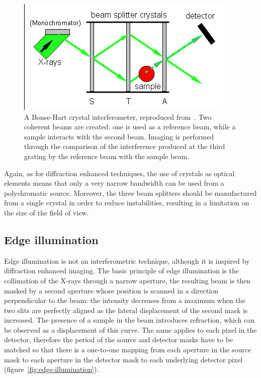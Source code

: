 \begin{figure}[htb]
    \centering
    \includegraphics[width=.6\textwidth]{gfx/Crystal_interferometer.png}
    \caption[Bonse-Hart interferometer.]{A Bonse-Hart crystal
        interferometer, reproduced from~\cite{bonse-hart-picture}. Two coherent beams are created: one is used as a
reference beam, while a sample interacts with the second beam. Imaging is
performed through the
comparison of the interference produced at the third grating by the
reference beam with the sample beam.}
    \label{fig:bonse-hart}
\end{figure}

Again, as for diffraction enhanced techniques, the use of crystals as
optical elements means that only a very narrow bandwidth can be used from a
polychromatic source. Moreover, the three beam splitters should be
manufactured from a single crystal in order to reduce instabilities,
resulting in a limitation on the size of the field of view.

\subsection{Edge illumination}
Edge illumination is not an interferometric technique, although it is
inspired by diffraction enhanced imaging. The basic principle of edge
illumination is the collimation of the X-rays through a narrow aperture,
the resulting beam is then masked by a second aperture whose position is
scanned in a direction perpendicular to the beam: the intensity decreases from a
maximum when the two slits are perfectly aligned as the lateral displacement
of the second mask is increased.
The presence of a sample in the beam introduces refraction, which can be
observed as a displacement of this curve. The same applies to each pixel in
the detector, therefore the period of the source and detector masks have to
be matched so that there is a one-to-one mapping from each aperture in the
source mask to each aperture in the detector mask to each underlying
detector pixel (figure~\ref{fig:edge-illumination}).

